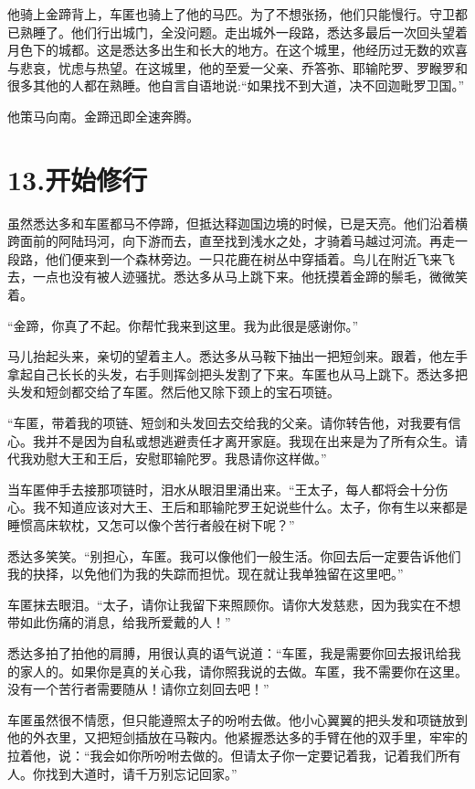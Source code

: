 \documentclass[12pt,twoside,openany]{book}
\begin{document}
他骑上金蹄背上，车匿也骑上了他的马匹。为了不想张扬，他们只能慢行。守卫都已熟睡了。他们行出城门，全没问题。走出城外一段路，悉达多最后一次回头望着月色下的城都。这是悉达多出生和长大的地方。在这个城里，他经历过无数的欢喜与悲哀，忧虑与热望。在这城里，他的至爱一父亲、乔答弥、耶输陀罗、罗睺罗和很多其他的人都在熟睡。他自言自语地说:“如果找不到大道，决不回迦毗罗卫国。”

他策马向南。金蹄迅即全速奔腾。

\chapter{13.开始修行}\label{ch13}

虽然悉达多和车匿都马不停蹄，但抵达释迦国边境的时候，已是天亮。他们沿着横跨面前的阿陆玛河，向下游而去，直至找到浅水之处，才骑着马越过河流。再走一段路，他们便来到一个森林旁边。一只花鹿在树丛中穿插着。鸟儿在附近飞来飞去，一点也没有被人迹骚扰。悉达多从马上跳下来。他抚摸着金蹄的鬃毛，微微笑着。

“金蹄，你真了不起。你帮忙我来到这里。我为此很是感谢你。”

马儿抬起头来，亲切的望着主人。悉达多从马鞍下抽出一把短剑来。跟着，他左手拿起自己长长的头发，右手则挥剑把头发割了下来。车匿也从马上跳下。悉达多把头发和短剑都交给了车匿。然后他又除下颈上的宝石项链。

“车匿，带着我的项链、短剑和头发回去交给我的父亲。请你转告他，对我要有信心。我并不是因为自私或想逃避责任才离开家庭。我现在出来是为了所有众生。请代我劝慰大王和王后，安慰耶输陀罗。我恳请你这样做。”

当车匿伸手去接那项链时，泪水从眼泪里涌出来。“王太子，每人都将会十分伤心。我不知道应该对大王、王后和耶输陀罗王妃说些什么。太子，你有生以来都是睡惯高床软枕，又怎可以像个苦行者般在树下呢？”

悉达多笑笑。“别担心，车匿。我可以像他们一般生活。你回去后一定要告诉他们我的抉择，以免他们为我的失踪而担忧。现在就让我单独留在这里吧。”

车匿抹去眼泪。“太子，请你让我留下来照顾你。请你大发慈悲，因为我实在不想带如此伤痛的消息，给我所爱戴的人！”

悉达多拍了拍他的肩膊，用很认真的语气说道：“车匿，我是需要你回去报讯给我的家人的。如果你是真的关心我，请你照我说的去做。车匿，我不需要你在这里。没有一个苦行者需要随从！请你立刻回去吧！”

车匿虽然很不情愿，但只能遵照太子的吩咐去做。他小心翼翼的把头发和项链放到他的外衣里，又把短剑插放在马鞍内。他紧握悉达多的手臂在他的双手里，牢牢的拉着他，说：“我会如你所吩咐去做的。但请太子你一定要记着我，记着我们所有人。你找到大道时，请千万别忘记回家。”
\end{document}

